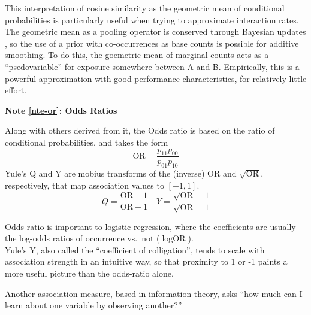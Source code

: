 \documentclass[%
	12pt,
		oneside,
		letterpaper
]{book}
\newcounter{quartocalloutnteno}
\newcommand{\quartocalloutnte}[1]{\refstepcounter{quartocalloutnteno}\label{#1}}
\begin{document}
This interpretation of cosine similarity as the geometric mean of conditional probabilities is particularly useful when trying to approximate interaction rates.
The geometric mean as a pooling operator is conserved through Bayesian updates \autocite{ProbabilityAggregationMethods_Allard2012}, so the use of a prior with co-occurrences as base counts is possible for additive smoothing.
To do this, the goemetric mean of marginal counts acts as a ``psedovariable'' for exposure somewhere between A and B.
Empirically, this is a powerful approximation with good performance characteristics, for relatively little effort.

\begin{tcolorbox}[enhanced jigsaw, bottomrule=.15mm, colback=white, breakable, toprule=.15mm, colframe=quarto-callout-note-color-frame, leftrule=.75mm, arc=.35mm, opacityback=0, rightrule=.15mm, left=2mm]

\quartocalloutnte{nte-or} 

\vspace{-3mm}\textbf{Note \ref*{nte-or}: Odds Ratios}\vspace{3mm}

Along with others derived from it, the Odds ratio is based on the ratio of conditional probabilities, and takes the form \[\text{OR}=\frac{p_{11}p_{00}}{p_{01}p_{10}}\]
Yule's Q and Y \autocite{MethodsMeasuringAssociation_Yule1912} are mobius transforms of the (inverse) \(\text{OR}\) and \(\sqrt{\text{OR}}\), respectively, that map association values to \([-1,1]\).
\[Q = \frac{\text{OR}-1}{\text{OR}+1}\quad Y=\frac{\sqrt{\text{OR}}-1}{\sqrt{\text{OR}}+1}\]

\end{tcolorbox}

Odds ratio is important to logistic regression, where the coefficients are usually the log-odds ratios of occurrence vs.~not (\(\log{\text{OR}}\)).\\
Yule's Y, also called the ``coefficient of colligation'', tends to scale with association strength in an intuitive way, so that proximity to 1 or -1 paints a more useful picture than the odds-ratio alone.

Another association measure, based in information theory, asks ``how much can I learn about one variable by observing another?''
\end{document}
